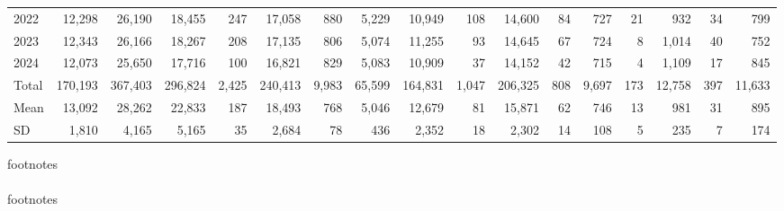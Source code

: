 \begin{sidewaystable}[h]
\begin{tabular}{lrrrrrrrrrrrrrrrr}
  2022 & 12,298 & 26,190 & 18,455 & 247 & 17,058 & 880 & 5,229 & 10,949 & 108 & 14,600 &  84 & 727 &  21 & 932 &  34 & 799 \\ 
  2023 & 12,343 & 26,166 & 18,267 & 208 & 17,135 & 806 & 5,074 & 11,255 &  93 & 14,645 &  67 & 724 &   8 & 1,014 &  40 & 752 \\ 
   \midrule
2024 & 12,073 & 25,650 & 17,716 & 100 & 16,821 & 829 & 5,083 & 10,909 &  37 & 14,152 &  42 & 715 &   4 & 1,109 &  17 & 845 \\ 
  Total & 170,193 & 367,403 & 296,824 & 2,425 & 240,413 & 9,983 & 65,599 & 164,831 & 1,047 & 206,325 & 808 & 9,697 & 173 & 12,758 & 397 & 11,633 \\ 
  Mean & 13,092 & 28,262 & 22,833 & 187 & 18,493 & 768 & 5,046 & 12,679 &  81 & 15,871 &  62 & 746 &  13 & 981 &  31 & 895 \\ 
  SD & 1,810 & 4,165 & 5,165 &  35 & 2,684 &  78 & 436 & 2,352 &  18 & 2,302 &  14 & 108 &   5 & 235 &   7 & 174 \\ 
   \bottomrule
\end{tabular}
\end{sidewaystable}
footnotes \\ 
  \midrule
{} \\ 
   \bottomrule
footnotes \\ 
  \midrule
{} \\ 
   \bottomrule
